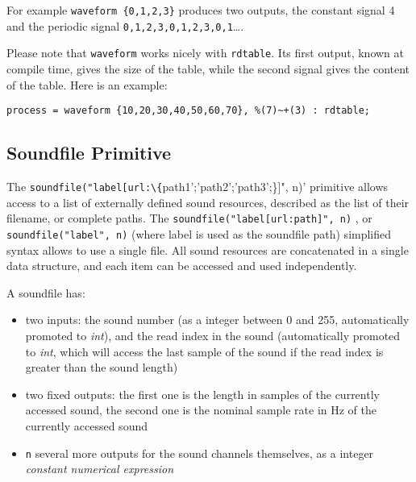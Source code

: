 For example \lstinline'waveform {0,1,2,3}' produces two outputs, the constant signal 4 and the periodic signal \lstinline'0,1,2,3,0,1,2,3,0,1'\ldots. 

Please note that \lstinline'waveform' works nicely with \lstinline'rdtable'. Its first output, known at compile time, gives the size of the table, while the second signal gives the content of the table. Here is an example:
\begin{lstlisting}
process = waveform {10,20,30,40,50,60,70}, %(7)~+(3) : rdtable;
\end{lstlisting}

\bigskip

\subsection{Soundfile Primitive}

The  \lstinline'soundfile("label[url:\{'path1';'path2';'path3';\}]", n)' primitive allows access to a list of externally defined sound resources, described as the list of their filename, or complete paths. The \lstinline'soundfile("label[url:path]", n)' , or \lstinline'soundfile("label", n)' (where label is used as the soundfile path) simplified syntax allows to use a single file. All sound resources are concatenated in a single data structure, and each item can be accessed and used independently.

A soundfile has:

\begin{itemize} 
\item two inputs: the sound number (as a integer between 0 and 255, automatically promoted to \textit{int}), and the read index in the sound (automatically promoted to \textit{int}, which will access the last sample of the sound if the read index is greater than the sound length)
\item two fixed outputs: the first one is the length in samples of the currently accessed sound, the second one is the nominal sample rate in Hz of the currently accessed sound
\item  \lstinline'n' several more outputs for the sound channels themselves, as a integer \textit{constant numerical expression}
\end{itemize}

